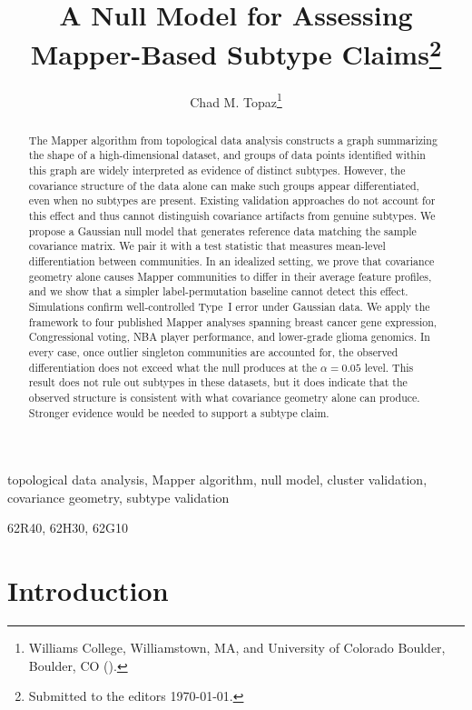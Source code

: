 \documentclass[hidelinks]{siamart251216}
\title{A Null Model for Assessing\\ Mapper-Based Subtype Claims\thanks{Submitted to the editors \today.
\funding{This work received no external funding.}}}
\author{Chad M. Topaz\thanks{Williams College, Williamstown, MA, and University of Colorado Boulder, Boulder, CO
  (\email{cmt6@williams.edu}).}}
\begin{document}
\maketitle

\begin{abstract}
The Mapper algorithm from topological data analysis constructs a graph
summarizing the shape of a high-dimensional dataset, and groups of data
points identified within this graph are widely interpreted as evidence
of distinct subtypes.  However, the covariance structure of the data
alone can make such groups appear differentiated, even when no subtypes
are present.  Existing validation approaches do not account for this effect and thus cannot distinguish covariance
artifacts from genuine subtypes.  We propose a Gaussian null model that generates reference data matching
the sample covariance matrix.  We pair it with a test statistic that measures mean-level
differentiation between communities.  In an idealized setting, we prove that covariance geometry alone causes
Mapper communities to differ in their average feature profiles, and we
show that a simpler label-permutation baseline cannot detect this effect.  Simulations confirm
well-controlled Type~I error under Gaussian data.  We apply the
framework to four published Mapper analyses spanning breast cancer gene
expression, Congressional voting, NBA player performance, and lower-grade
glioma genomics.  In every case, once outlier singleton communities are accounted for,
the observed differentiation does not exceed what the
null produces at the $\alpha = 0.05$ level.  This result does not rule out subtypes in these datasets, but it does indicate that the observed
structure is consistent with what covariance geometry alone can produce.  Stronger evidence would be needed to support a subtype claim.
\end{abstract}

\begin{keywords}
topological data analysis, Mapper algorithm, null model, cluster validation, covariance geometry, subtype validation
\end{keywords}

\begin{MSCcodes}
62R40, 62H30, 62G10
\end{MSCcodes}


\section{Introduction}\label{sec:intro}
\end{document}
